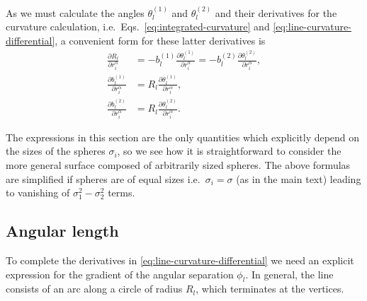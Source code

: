 \documentclass[11pt,twoside]{report}
\begin{document}
As we must calculate the angles $\theta_l^{(1)}$ and $\theta_l^{(2)}$ and their derivatives for the curvature calculation, i.e.\ Eqs.\ \eqref{eq:integrated-curvature} and \eqref{eq:line-curvature-differential}, a convenient form for these latter derivatives is
\begin{subequations}
\begin{align}
  \frac{\partial R_l}{\partial r_i^\alpha} &
  = - b_l^{(1)} \frac{\partial\theta_l^{(1)}}{\partial r_i^\alpha}
  = - b_l^{(2)} \frac{\partial\theta_l^{(2)}}{\partial r_i^\alpha}, \\
  \frac{\partial b_l^{(1)}}{\partial r_i^\alpha} &=
  R_l \frac{\partial\theta_l^{(1)}}{\partial r_i^\alpha}, \\
  \frac{\partial b_l^{(2)}}{\partial r_i^\alpha} &=
  R_l \frac{\partial\theta_l^{(2)}}{\partial r_i^\alpha}.
\end{align}
\end{subequations}

The expressions in this section are the only quantities which explicitly depend on the sizes of the spheres $\sigma_i$, so we see how it is straightforward to consider the more general surface composed of arbitrarily sized spheres.
The above formulas are simplified if spheres are of equal sizes i.e.\ $\sigma_i = \sigma$ (as in the main text) leading to vanishing of $\sigma_1^2 - \sigma_2^2$ terms.

\subsection{Angular length}

To complete the derivatives in \eqref{eq:line-curvature-differential} we need an explicit expression for the gradient of the angular separation $\phi_l$.
In general, the line consists of an arc along a circle of radius $R_l$, which terminates at the vertices.
\end{document}

